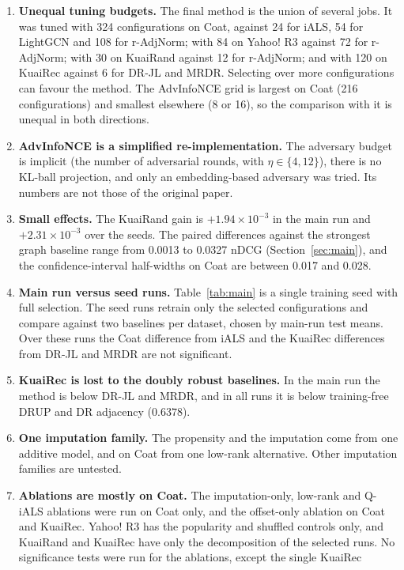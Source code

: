 \begin{enumerate}
\item \textbf{Unequal tuning budgets.} The final method is the union of several jobs. It was tuned with 324
configurations on Coat, against 24 for iALS, 54 for LightGCN and 108 for r-AdjNorm; with 84 on Yahoo! R3 against
72 for r-AdjNorm; with 30 on KuaiRand against 12 for r-AdjNorm; and with 120 on KuaiRec against 6 for DR-JL and
MRDR. Selecting over more configurations can favour the method. The AdvInfoNCE grid is largest on Coat
(216 configurations) and smallest elsewhere (8 or 16), so the comparison with it is unequal in both directions.
\item \textbf{AdvInfoNCE is a simplified re-implementation.} The adversary budget is implicit (the number of
adversarial rounds, with $\eta\in\{4,12\}$), there is no KL-ball projection, and only an embedding-based adversary was
tried. Its numbers are not those of the original paper.
\item \textbf{Small effects.} The KuaiRand gain is $+1.94\times10^{-3}$ in the main run and $+2.31\times10^{-3}$ over
the seeds. The paired differences against the strongest graph baseline range from 0.0013 to 0.0327 nDCG
(Section~\ref{sec:main}), and the confidence-interval half-widths on Coat are between 0.017 and 0.028.
\item \textbf{Main run versus seed runs.} Table~\ref{tab:main} is a single training seed with full selection. The seed
runs retrain only the selected configurations and compare against two baselines per dataset, chosen by main-run test
means. Over these runs the Coat difference from iALS and the KuaiRec differences from DR-JL and MRDR are not significant.
\item \textbf{KuaiRec is lost to the doubly robust baselines.} In the main run the method is below DR-JL and MRDR, and
in all runs it is below training-free DRUP and DR adjacency ($0.6378$).
\item \textbf{One imputation family.} The propensity and the imputation come from one additive model, and on Coat
from one low-rank alternative. Other imputation families are untested.
\item \textbf{Ablations are mostly on Coat.} The imputation-only, low-rank and Q-iALS ablations were run
on Coat only, and the offset-only ablation on Coat and KuaiRec. Yahoo! R3 has the popularity and shuffled controls only, and KuaiRand and KuaiRec have only the
decomposition of the selected runs. No significance tests were run for the ablations, except the single KuaiRec

\end{enumerate}
